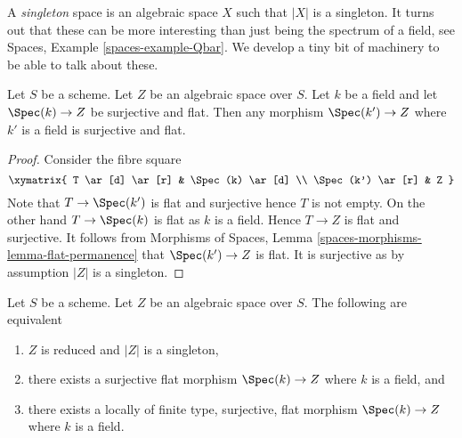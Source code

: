 \noindent
A {\it singleton} space is an algebraic space $X$ such that $|X|$ is
a singleton. It turns out that these can be more interesting than
just being the spectrum of a field, see
Spaces, Example \ref{spaces-example-Qbar}.
We develop a tiny bit of machinery to be able to talk about these.

\begin{lemma}
\label{lemma-flat-cover-by-field}
Let $S$ be a scheme. Let $Z$ be an algebraic space over $S$.
Let $k$ be a field and let $\Spec(k) \to Z$ be surjective and flat.
Then any morphism $\Spec(k') \to Z$ where $k'$ is a field is
surjective and flat.
\end{lemma}

\begin{proof}
Consider the fibre square
$$
\xymatrix{
T \ar[d] \ar[r] & \Spec(k) \ar[d] \\
\Spec(k') \ar[r] & Z
}
$$
Note that $T \to \Spec(k')$ is flat and surjective hence $T$
is not empty. On the other hand $T \to \Spec(k)$ is flat as
$k$ is a field. Hence $T \to Z$ is flat and surjective.
It follows from
Morphisms of Spaces, Lemma \ref{spaces-morphisms-lemma-flat-permanence}
that $\Spec(k') \to Z$ is flat. It is surjective as by assumption
$|Z|$ is a singleton.
\end{proof}

\begin{lemma}
\label{lemma-unique-point}
Let $S$ be a scheme.
Let $Z$ be an algebraic space over $S$. The following are equivalent
\begin{enumerate}
\item $Z$ is reduced and $|Z|$ is a singleton,
\item there exists a surjective flat morphism $\Spec(k) \to Z$
where $k$ is a field, and
\item there exists a locally of finite type, surjective, flat morphism
$\Spec(k) \to Z$ where $k$ is a field.
\end{enumerate}
\end{lemma}

